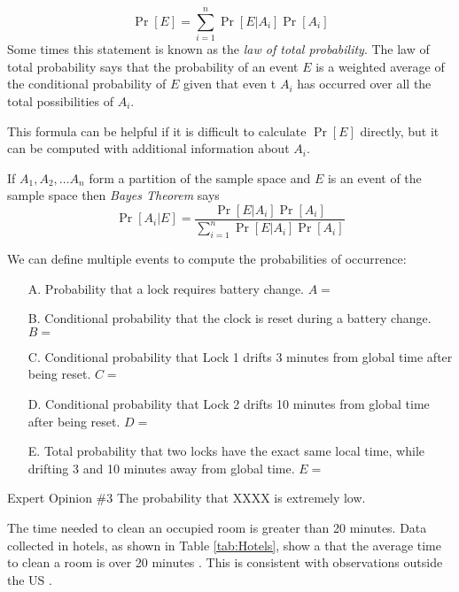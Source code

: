 \documentclass[12pt,reqno]{amsart}
\newcommand{\vs}{\vspace*{0.1in}\noindent}
\begin{document}
\[
    \Pr[E] = \sum_{i=1}^n \Pr[E | A_i] \Pr[A_i]
\]
Some times this statement is known as the \emph{law of total
  probability}.
The law of total probability says that the probability of an event $E$
  is a weighted average of the conditional probability of $E$ given
  that even t $A_i$ has occurred over all the total possibilities of
  $A_i$.


This formula can be helpful if it is difficult to calculate \( \Pr[E]
\) directly, but it can be computed with additional information about
\( A_i \).


If \( A_1, A_2, \dots A_n \) form a  partition of the sample space and
$E$ is an event of the sample space then \emph{Bayes Theorem} says
\[
     \Pr[A_i | E]
     = \frac{ \Pr[ E | A_i] \Pr[A_i]}{\sum_{i=1}^n \Pr[E | A_i]
     \Pr[A_i]}
\]

We can define multiple events to compute the probabilities of  occurrence: 

\begin{itemize}
	\item[A.] Probability that a lock requires battery change. $A = $
	\item[B.] Conditional probability that the clock is reset during a battery change. $B = $
	\item[C.] Conditional probability that Lock 1 drifts 3 minutes from global time after being reset. $C=$
	\item[D.] Conditional probability that Lock 2 drifts 10 minutes from global time after being reset. $D=$
	\item[E.] Total probability that two locks have the exact same local time, while drifting 3 and 10 minutes away from global time. $E=$
\end{itemize}

	
	\vs
	\begin{myblock}{Expert Opinion \#3}
		The probability that XXXX is extremely low.  
	\end{myblock}
	\vs
		
The time needed to clean an occupied room is greater than 20 minutes. Data collected in hotels, as shown in Table \ref{tab:Hotels}, show a that the average time to clean a room is over 20 minutes \cite{malony2011analysis}. This is consistent with observations outside the US \cite{kadry2017simulation, mehrez2000work}. 
\end{document}
